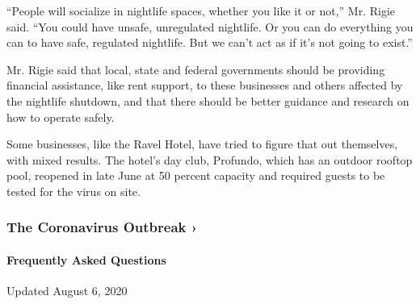 ``People will socialize in nightlife spaces, whether you like it or
not,'' Mr. Rigie said. ``You could have unsafe, unregulated nightlife.
Or you can do everything you can to have safe, regulated nightlife. But
we can't act as if it's not going to exist.''

Mr. Rigie said that local, state and federal governments should be
providing financial assistance, like rent support, to these businesses
and others affected by the nightlife shutdown, and that there should be
better guidance and research on how to operate safely.

Some businesses, like the Ravel Hotel, have tried to figure that out
themselves, with mixed results. The hotel's day club, Profundo, which
has an outdoor rooftop pool, reopened in late June at 50 percent
capacity and required guests to be tested for the virus on site.

\href{https://www.nytimes.com/news-event/coronavirus?action=click\&pgtype=Article\&state=default\&region=MAIN_CONTENT_3\&context=storylines_faq}{}

\hypertarget{the-coronavirus-outbreak-}{%
\subsubsection{The Coronavirus Outbreak
›}\label{the-coronavirus-outbreak-}}

\hypertarget{frequently-asked-questions}{%
\paragraph{Frequently Asked
Questions}\label{frequently-asked-questions}}

Updated August 6, 2020

